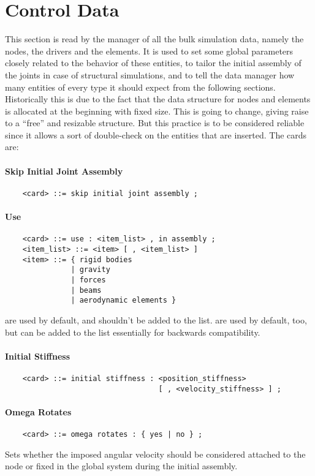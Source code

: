 \chapter{Control Data}
This section is read by the manager of all the bulk simulation data, namely
the nodes, the drivers and the elements. It is used to set some global
parameters closely related to the behavior of these entities, to tailor the
initial assembly of the joints in case of structural simulations, and to
tell the data manager how many entities of every type it should expect from
the following sections. Historically this is due to the fact that the data
structure for nodes and elements is allocated at the beginning with fixed
size. This is going to change, giving raise to a ``free'' and resizable
structure. But this practice is to be considered reliable since it allows a
sort of double-check on the entities that are inserted.
The cards are: 

\subsubsection{Skip Initial Joint Assembly}
\begin{verbatim}
    <card> ::= skip initial joint assembly ;
\end{verbatim}

\subsubsection{Use}
\begin{verbatim}
    <card> ::= use : <item_list> , in assembly ;
    <item_list> ::= <item> [ , <item_list> ]
    <item> ::= { rigid bodies 
               | gravity
               | forces
               | beams
               | aerodynamic elements } 
\end{verbatim}
 are used by default, and shouldn't be added to the list.
 are used by default, too, but can be added to the list
essentially for backwards compatibility.

\subsubsection{Initial Stiffness}
\begin{verbatim}
    <card> ::= initial stiffness : <position_stiffness>
                                   [ , <velocity_stiffness> ] ;
\end{verbatim}

\subsubsection{Omega Rotates}
\begin{verbatim}
    <card> ::= omega rotates : { yes | no } ;
\end{verbatim}
Sets whether the imposed angular velocity should be considered attached 
to the node or fixed in the global system during the initial assembly.

